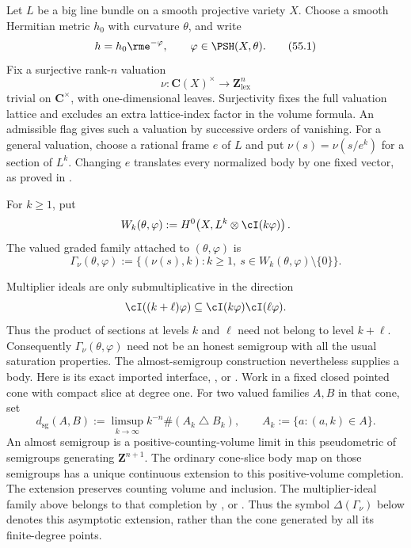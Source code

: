 Let $L$ be a big line bundle on a smooth projective variety $X$.
Choose a smooth Hermitian metric $h_0$ with curvature $\theta$, and write
\[
                         h=h_0\rme^{-\varphi},
        \qquad \varphi\in\PSH(X,\theta).
\tag{55.1}\label{eq:ok-partial-metric}
\]
Fix a surjective rank-$n$ valuation
\[
             \nu:\mathbf C(X)^\times\longrightarrow\mathbf Z^n_{\mathrm{lex}}
\]
trivial on $\mathbf C^\times$, with one-dimensional leaves.
Surjectivity fixes the full valuation lattice and excludes an extra
lattice-index factor in the volume formula.
An admissible flag gives such a valuation by successive orders of vanishing.
For a general valuation, choose a rational frame $e$ of $L$ and put
$\nu(s)=\nu(s/e^k)$ for a section of $L^k$.
Changing $e$ translates every normalized body by one fixed vector,
as proved in .

\begin{definition}
\label{def:ok-multiplier-series}
For $k\geq1$, put
\[
 W_k(\theta,\varphi)
 :=H^0\!\left(X,L^k\otimes\cI(k\varphi)\right).
\]
The valued graded family attached to $(\theta,\varphi)$ is
\[
 \Gamma_\nu(\theta,\varphi)
 :=\{(\nu(s),k):k\geq1,\ s\in W_k(\theta,\varphi)\setminus\{0\}\}.
\tag{55.2}\label{eq:ok-valued-family}
\]
\end{definition}

Multiplier ideals are only submultiplicative in the direction
\[
 \cI((k+\ell)\varphi)
       \subseteq\cI(k\varphi)\cI(\ell\varphi).
\]
Thus the product of sections at levels $k$ and $\ell$ need not belong
to level $k+\ell$.  Consequently $\Gamma_\nu(\theta,\varphi)$ need not
be an honest semigroup with all the usual saturation properties.
The almost-semigroup construction nevertheless supplies a body.  Here is
its exact imported interface, \cite[Theorem~3.14 and Corollary~3.15]{Xia21},
or \cite[Theorem~10.1.2 and Corollary~10.1.2]{XiaBook}.
Work in a fixed closed pointed cone with compact slice at degree one.
For two valued families $A,B$ in that cone, set
\[
 d_{\mathrm{sg}}(A,B)
 :=\limsup_{k\to\infty}k^{-n}\#(A_k\mathbin{\triangle}B_k),
 \qquad A_k:=\{a:(a,k)\in A\}.
\tag{55.2a}\label{eq:ok-almost-semigroup-distance}
\]
An almost semigroup is a positive-counting-volume limit in this
pseudometric of semigroups generating $\mathbf Z^{n+1}$.
The ordinary cone-slice body map on those semigroups has a unique
continuous extension to this positive-volume completion.
The extension preserves counting volume and inclusion.
The multiplier-ideal family above belongs to that completion by
\cite[Section~5.1]{Xia21}, or \cite[Theorem~10.3.1]{XiaBook}.
Thus the symbol $\Delta(\Gamma_\nu)$ below denotes this asymptotic
extension, rather than the cone generated by all its finite-degree points.

